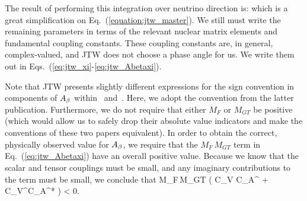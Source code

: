 The result of performing this integration over neutrino direction is:
\unskip which is a great simplification on Eq.~(\ref{equation:jtw_master}).  We still must write the remaining parameters in terms of the relevant nuclear matrix elements and fundamental coupling constants.  These coupling constants are, in general, complex-valued, and JTW does not choose a phase angle for us.  We write them out in 
Eqs.~(\ref{eq:jtw_xi}-\ref{eq:jtw_Abetaxi}).

Note that JTW presents slightly different expressions for the sign convention in components of $A_{\beta}$ within~\cite{jtw} and~\cite{jtw_coulomb}.  Here, we adopt the convention from the latter publication.  Furthermore, we do not require that either $M_F$ or $M_{GT}$ be positive (which would allow us to safely drop their absolute value indicators and make the conventions of these two papers equivalent).  In order to obtain the correct, physically observed value for $A_{\beta}$, we require that the 
$M_{F}\,M_{GT}$ term in Eq.~(\ref{eq:jtw_Abetaxi}) have an overall positive value.  Because we know that the scalar and tensor couplings must be small, and any imaginary contributions to the term must be small, we conclude that
\bea
	M_{F}\,M_{GT} \left( C_V C_A^{\prime *} + C_V^\prime C_A^* \right) < 0.
\eea



